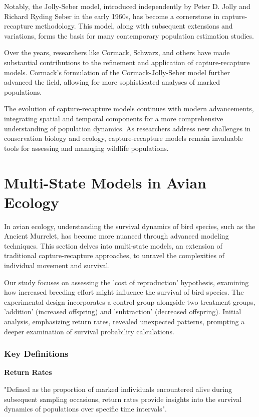 \documentclass{article}
\begin{document}
Notably, the Jolly-Seber model, introduced independently by Peter D. Jolly and Richard Ryding Seber in the early 1960s, has become a cornerstone in capture-recapture methodology. This model, along with subsequent extensions and variations, forms the basis for many contemporary population estimation studies.

Over the years, researchers like Cormack, Schwarz, and others have made substantial contributions to the refinement and application of capture-recapture models. Cormack's formulation of the Cormack-Jolly-Seber model further advanced the field, allowing for more sophisticated analyses of marked populations.

The evolution of capture-recapture models continues with modern advancements, integrating spatial and temporal components for a more comprehensive understanding of population dynamics. As researchers address new challenges in conservation biology and ecology, capture-recapture models remain invaluable tools for assessing and managing wildlife populations.


\section{Multi-State Models in Avian Ecology}

In avian ecology, understanding the survival dynamics of bird species, such as the Ancient Murrelet, has become more nuanced through advanced modeling techniques. This section delves into multi-state models, an extension of traditional capture-recapture approaches, to unravel the complexities of individual movement and survival.

Our study focuses on assessing the 'cost of reproduction' hypothesis, examining how increased breeding effort might influence the survival of bird species. The experimental design incorporates a control group alongside two treatment groups, 'addition' (increased offspring) and 'subtraction' (decreased offspring). Initial analysis, emphasizing return rates, revealed unexpected patterns, prompting a deeper examination of survival probability calculations.

\subsubsection*{Key Definitions} 


\textbf{Return Rates}

"Defined as the proportion of marked individuals encountered alive during subsequent sampling occasions, return rates provide insights into the survival dynamics of populations over specific time intervals".\cite{mark_website}
\end{document}
